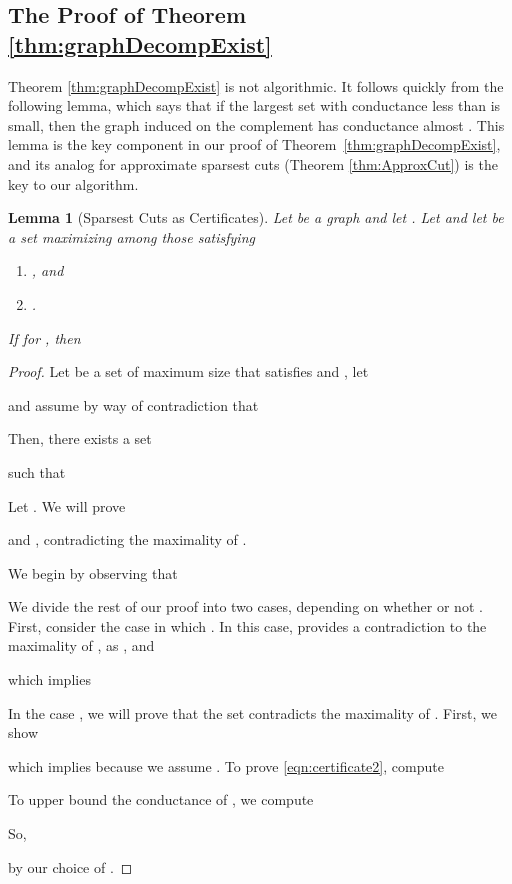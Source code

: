 \documentclass[11pt]{article}
\newtheorem{lemma}[theorem]{Lemma}
\begin{document}
\subsection{The Proof of Theorem \ref{thm:graphDecompExist}}

Theorem \ref{thm:graphDecompExist} is not algorithmic.
It follows quickly from
  the following lemma, which says that if the largest set with conductance less
  than  is small,
  then the graph induced on the complement has conductance almost .
This lemma is the key component in our proof
  of Theorem~\ref{thm:graphDecompExist}, and its analog for 
  approximate sparsest cuts (Theorem \ref{thm:ApproxCut})
  is the key to our algorithm.

\begin{lemma}[Sparsest Cuts as Certificates]\label{lem:certificate}
Let  be a graph and let .
Let  and let  be a set
  maximizing  among those
  satisfying
\begin{enumerate}
\item [(C.1)]  , and
\item [(C.2)] .
\end{enumerate}
If  for ,
  then

\end{lemma}
\begin{proof}
Let  be a set of maximum size that satisfies  and ,
  let

and
  assume by way of contradiction that
  
Then, there exists a set
  
  such that


Let .
We will prove

and ,
  contradicting the maximality of .

We begin by observing that


We divide the rest of our proof into two cases, depending on whether
  or not .
First, consider the case in which
  .
In this case,  provides a contradiction to the maximality of
  , as ,
  and

which implies


In the case ,
  we will prove that the set  contradicts the maximality of .
First, we show

which implies
   because we assume .
To prove \eqref{eqn:certificate2}, compute


To upper bound the conductance of , we compute


So,

by our choice of .
\end{proof}
\end{document}
